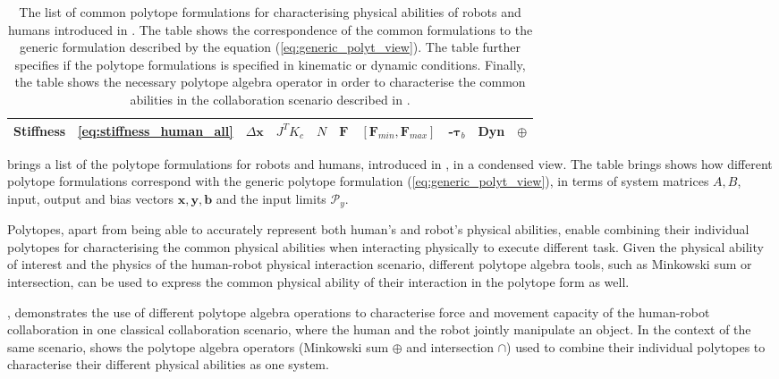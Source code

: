 \begin{table}[!b]
\begin{tabular}{|l|c|c|c|c|c|c|c|c|c|}
Stiffness & \ref{eq:stiffness_human_all} &$\Delta\bm{x}$ & $J^TK_c$ & $N$ & $\bm{F}$ & $[\bm{F}_{min},\bm{F}_{max}]$ & -$\bm{\tau}_b$ & Dyn & $\oplus$ \\
\hline
\end{tabular}
\caption{The list of common polytope formulations for characterising physical abilities of robots and humans introduced in . The table shows the correspondence of the common formulations to the generic formulation described by the equation (\ref{eq:generic_polyt_view}). The table further specifies if the polytope formulations is specified in kinematic or dynamic conditions. Finally, the table shows the necessary polytope algebra operator in order to characterise the common abilities in the collaboration scenario described in .}
\label{tab:merged_table}
\end{table}

 brings a list of the polytope formulations for robots and humans, introduced in , in a condensed view. The table brings shows how different polytope formulations correspond with the generic polytope formulation (\ref{eq:generic_polyt_view}), in terms of system matrices $A,B$, input, output and bias vectors $\bm{x},\bm{y},\bm{b}$ and the input limits $\mathcal{P}_y$.

Polytopes, apart from being able to accurately represent both human's and robot's physical abilities, enable combining their individual polytopes for characterising the common physical abilities when interacting physically to execute different task. Given the physical ability of interest and the physics of the human-robot physical interaction scenario, different polytope algebra tools, such as Minkowski sum or intersection, can be used to express the common physical ability of their interaction in the polytope form as well.


, demonstrates the use of different polytope algebra operations to characterise force and movement capacity of the human-robot collaboration in one classical collaboration scenario, where the human and the robot jointly manipulate an object. In the context of the same scenario,  shows the polytope algebra operators (Minkowski sum $\oplus$ and intersection $\cap$) used to combine their individual polytopes to characterise their different physical abilities as one system.


